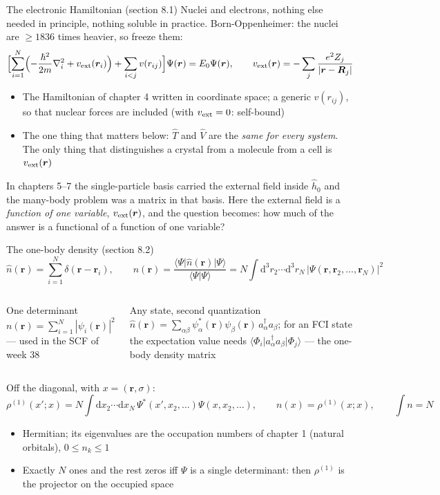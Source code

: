 \documentclass[aspectratio=169,10pt]{beamer}
\newcommand{\mbbox}[1]{%
  \begin{tcolorbox}[colback=paleblue,colframe=uioblue,title={\bfseries Many-body connection}]
  #1
  \end{tcolorbox}}
\newcommand{\braket}[2]{\langle #1\vert #2\rangle}
\newcommand{\element}[3]{\langle #1\vert #2\vert #3\rangle}
\newcommand{\ad}[1]{a_{#1}^{\dagger}}
\newcommand{\dd}{\mathrm{d}}
\begin{document}
\begin{frame}{The electronic Hamiltonian (section 8.1)}
  \small
  Nuclei and electrons, nothing else needed in principle, nothing soluble in practice. Born-Oppenheimer: the nuclei are $\ge1836$ times heavier, so freeze them:
  \[
    \Bigl[\sum_{i=1}^N\Bigl(-\frac{\hbar^2}{2m}\nabla_i^2+v_{\rm ext}(\bm r_i)\Bigr)+\sum_{i<j}v(r_{ij})\Bigr]\Psi(\bm r)=E_0\Psi(\bm r),
    \qquad
    v_{\rm ext}(\bm r)=-\sum_j\frac{e^2Z_j}{|\bm r-\bm R_j|}
  \]
  \begin{itemize}
    \item The Hamiltonian of chapter 4 written in coordinate space; a generic $v(r_{ij})$, so that nuclear forces are included (with $v_{\rm ext}=0$: self-bound)
    \item \alert{The one thing that matters below:} $\hat T$ and $\hat V$ are the \emph{same for every system}. The only thing that distinguishes a crystal from a molecule from a cell is $v_{\rm ext}(\bm r)$
  \end{itemize}
  \mbbox{In chapters 5--7 the single-particle basis carried the external field inside $\hat h_0$ and the many-body problem was a matrix in that basis. Here the external field is a \emph{function of one variable}, $v_{\rm ext}(\bm r)$, and the question becomes: how much of the answer is a functional of a function of one variable?}
\end{frame}

\begin{frame}{The one-body density (section 8.2)}
  \small
  \[
    \hat n(\bm r)=\sum_{i=1}^N\delta(\bm r-\bm r_i),\qquad
    n(\bm r)=\frac{\element\Psi{\hat n(\bm r)}\Psi}{\braket\Psi\Psi}
    =N\int\dd^3r_2\cdots\dd^3r_N\,|\Psi(\bm r,\bm r_2,\dots,\bm r_N)|^2
  \]
  \begin{columns}[T]
    \begin{block}{One determinant}
      $n(\bm r)=\sum_{i=1}^N|\psi_i(\bm r)|^2$ --- used in the SCF of week 38
    \end{block}
    \begin{block}{Any state, second quantization}
      $\hat n(\bm r)=\sum_{\alpha\beta}\psi_\alpha^{*}(\bm r)\psi_\beta(\bm r)\,\ad\alpha a_\beta$; for an FCI state the expectation value needs $\element{\Phi_i}{\ad\alpha a_\beta}{\Phi_j}$ --- the one-body density matrix
    \end{block}
  \end{columns}
  \vspace{0.3em}
  Off the diagonal, with $x=(\bm r,\sigma)$:
  \[
    \rho^{(1)}(x';x)=N\int\dd x_2\cdots\dd x_N\,\Psi^{*}(x',x_2,\dots)\Psi(x,x_2,\dots),\qquad n(x)=\rho^{(1)}(x;x),\qquad\int n=N
  \]
  \begin{itemize}
    \item Hermitian; its eigenvalues are the occupation numbers of chapter 1 (natural orbitals), $0\le n_k\le1$
    \item Exactly $N$ ones and the rest zeros \alert{iff} $\Psi$ is a single determinant: then $\rho^{(1)}$ is the projector on the occupied space
  \end{itemize}
\end{frame}
\end{document}
